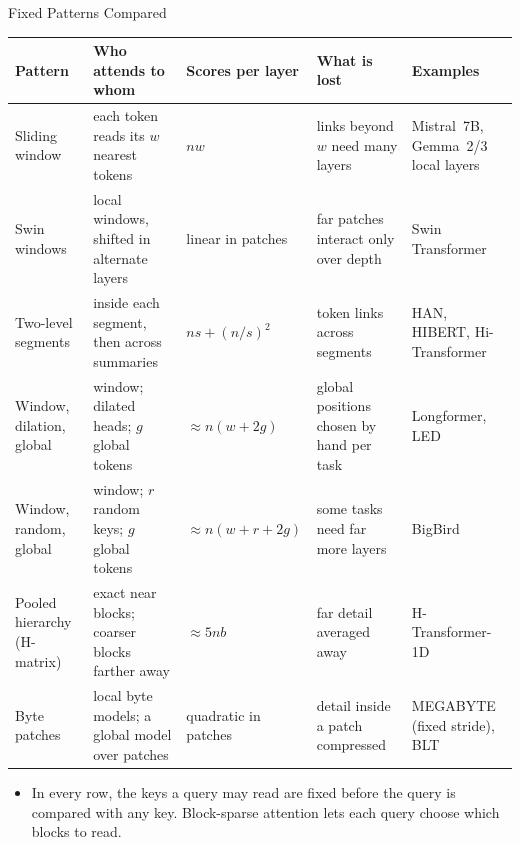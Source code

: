 \begin{frame}{Fixed Patterns Compared}
  \centering
  {\scriptsize
  \setlength{\tabcolsep}{4pt}
  \begin{tabular}{>{\raggedright\arraybackslash}p{2.6cm} >{\raggedright\arraybackslash}p{3.0cm} >{\raggedright\arraybackslash}p{1.8cm} >{\raggedright\arraybackslash}p{2.5cm} >{\raggedright\arraybackslash}p{2.5cm}}
    \toprule
    \textbf{Pattern} & \textbf{Who attends to whom} & \textbf{Scores per layer} & \textbf{What is lost} & \textbf{Examples} \\
    \midrule
    Sliding window & each token reads its $w$ nearest tokens & $nw$ & links beyond $w$ need many layers & Mistral~7B, Gemma~2/3 local layers \\
    \addlinespace[0.1em]
    Swin windows & local windows, shifted in alternate layers & linear in patches & far patches interact only over depth & Swin Transformer \\
    \addlinespace[0.1em]
    Two-level segments & inside each segment, then across summaries & $ns + (n/s)^2$ & token links across segments & HAN, HIBERT, Hi-Transformer \\
    \addlinespace[0.1em]
    Window, dilation, global & window; dilated heads; $g$ global tokens & $\approx n(w + 2g)$ & global positions chosen by hand per task & Longformer, LED \\
    \addlinespace[0.1em]
    Window, random, global & window; $r$ random keys; $g$ global tokens & $\approx n(w + r + 2g)$ & some tasks need far more layers & BigBird \\
    \addlinespace[0.1em]
    Pooled hierarchy (H-matrix) & exact near blocks; coarser blocks farther away & $\approx 5nb$ & far detail averaged away & H-Transformer-1D \\
    \addlinespace[0.1em]
    Byte patches & local byte models; a global model over patches & quadratic in patches & detail inside a patch compressed & MEGABYTE (fixed stride), BLT \\
    \bottomrule
  \end{tabular}\par}
  \vspace{0.3em}
  \begin{itemize}\footnotesize
    \item[\textcolor{red}{$\blacktriangleright$}] In every row, the keys a query may read are fixed before the query is compared with any key. Block-sparse attention lets each query choose which blocks to read.
  \end{itemize}
\end{frame}

